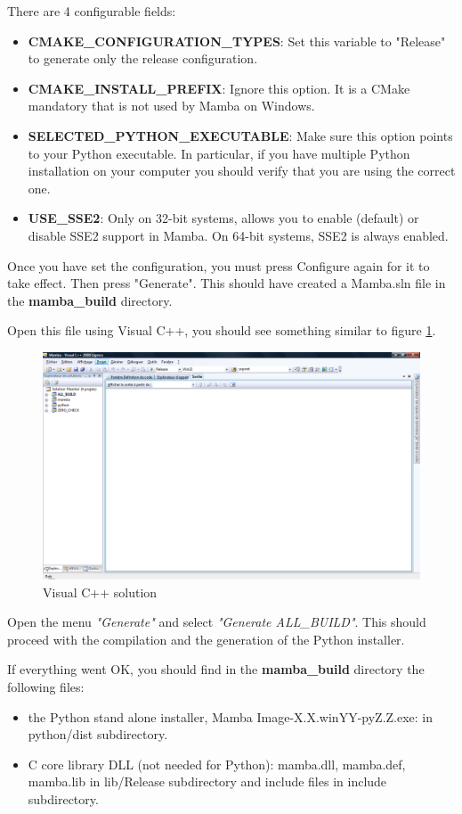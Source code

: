 \documentclass[a4paper,10pt,oneside]{article}
\begin{document}
There are 4 configurable fields:
\begin{itemize}
\item \textbf{CMAKE\_CONFIGURATION\_TYPES}: Set this variable to "Release" to 
generate only the release configuration.
\item \textbf{CMAKE\_INSTALL\_PREFIX}: Ignore this option. It is a CMake 
mandatory that is not used by Mamba on Windows.
\item \textbf{SELECTED\_PYTHON\_EXECUTABLE}: Make sure this option points 
to your Python executable. In particular, if you have multiple Python 
installation on your computer you should verify that you are using the 
correct one.
\item \textbf{USE\_SSE2}: Only on 32-bit systems, allows you to enable (default)
or disable SSE2 support in Mamba. On 64-bit systems, SSE2 is always enabled.
\end{itemize}

Once you have set the configuration, you must press Configure again for it to
take effect. Then press "Generate". This should have created a Mamba.sln file
in the \textbf{mamba\_build} directory.

Open this file using Visual C++, you should see something similar to figure
\ref{fig:visualcpp}.

\begin{figure}
\centering
\includegraphics[scale=0.3]{images/visualcpp.png}
\caption{Visual C++ solution}
\label{fig:visualcpp}
\end{figure}

Open the menu \textit{"Generate"} and select \textit{"Generate ALL\_BUILD"}.
This should proceed with the compilation and the generation of the Python installer.

If everything went OK, you should find in the \textbf{mamba\_build} directory
the following files:
\begin{itemize}
\item the Python stand alone installer, Mamba Image-X.X.winYY-pyZ.Z.exe: in python/dist subdirectory.
\item C core library DLL (not needed for Python): mamba.dll, mamba.def, mamba.lib in lib/Release subdirectory and include files in include subdirectory.
\end{itemize}
\end{document}
